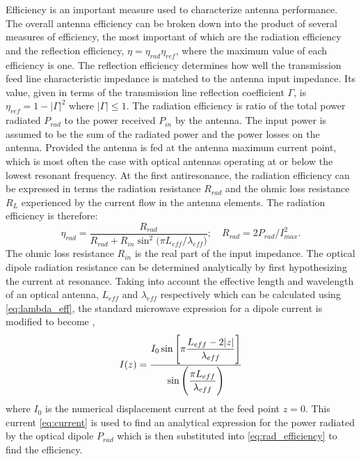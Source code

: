 \documentclass[11pt]{article}
\begin{document}

Efficiency is an important measure used to characterize antenna performance. The overall antenna efficiency can be broken down into the product of several measures of efficiency, the most important of which are the radiation efficiency and the reflection efficiency, $\eta  = \eta_{rad}\eta_{ref}$,
where the maximum value of each efficiency is one. The reflection efficiency determines how well the transmission feed line characteristic impedance is matched to the antenna input impedance. Its value, given in terms of the transmission line reflection coefficient $\Gamma$, is $\eta_{ref} = 1 - \left| \Gamma  \right|^2$ where $\left| \Gamma \right| \le 1$. The radiation efficiency is ratio of the total power radiated $P_{rad}$ to the power received $P_{in}$ by the antenna. The input power is assumed to be the sum of the radiated power and the power losses on the antenna. Provided the antenna is fed at the antenna maximum current point, which is most often the case with optical antennas operating at or below the lowest resonant frequency. At the first antiresonance, the radiation efficiency can be expressed in terms the radiation resistance $R_{rad}$ and the ohmic loss resistance $R_L$ experienced by the current flow in the antenna elements. The radiation efficiency is therefore:
%
\begin{equation}
  \eta_{rad} = \frac{R_{rad}}{R_{rad} + R_{in} \sin^2(\pi L_{eff}/{\lambda _{eff})}}; \quad  R_{rad} = 2 P_{rad}/I_{max}^2.
  \label{eq:rad_efficiency}
\end{equation}
%
The ohmic loss resistance $R_{in}$ is the real part of the input impedance. The optical dipole radiation resistance can be determined analytically by first hypothesizing the current at resonance. Taking into account the effective length and wavelength of an optical antenna, $L_{eff}$ and $\lambda_{eff}$  respectively which can be calculated using \eqref{eq:lambda_eff}, the standard microwave expression for a dipole current is modified to become \cite{Alu2007},
%
\begin{equation}
  I(z) = \frac{\displaystyle I_0 \sin \left [\pi \frac{L_{eff} - 2|z|}{\lambda _{eff}}\right]}{\displaystyle \sin \left( \frac {\pi L_{eff}}{\lambda_{eff}} \right)}
  \label{eq:current}
\end{equation}
%
where $I_0$ is the numerical displacement current at the feed point $z = 0$. This current \eqref{eq:current} is used to find an analytical expression for the power radiated by the optical dipole $P_{rad}$ which is then substituted into \eqref{eq:rad_efficiency} to find the efficiency.
\end{document}
